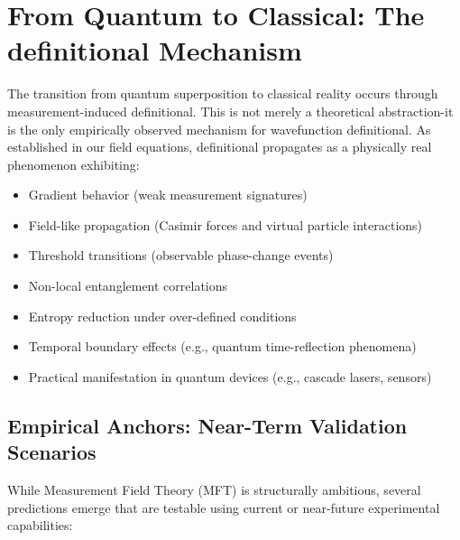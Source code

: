 \section{From Quantum to Classical: The definitional Mechanism}

The transition from quantum superposition to classical reality occurs through measurement-induced definitional. This is not merely a theoretical abstraction-it is the only empirically observed mechanism for wavefunction definitional. As established in our field equations, definitional propagates as a physically real phenomenon exhibiting:

\begin{itemize}
  \item Gradient behavior (weak measurement signatures)
  \item Field-like propagation (Casimir forces and virtual particle interactions)
  \item Threshold transitions (observable phase-change events)
  \item Non-local entanglement correlations
  \item Entropy reduction under over-defined conditions
  \item Temporal boundary effects (e.g., quantum time-reflection phenomena)
  \item Practical manifestation in quantum devices (e.g., cascade lasers, sensors)
\end{itemize}

\subsection*{Empirical Anchors: Near-Term Validation Scenarios}

While Measurement Field Theory (MFT) is structurally ambitious, several predictions emerge that are testable using current or near-future experimental capabilities:

